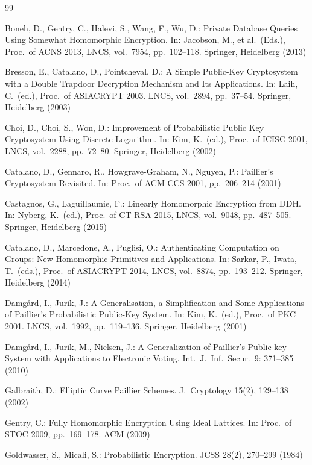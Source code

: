\documentclass[11pt,a4paper]{article}
\theoremstyle{remark}
\begin{document}
\begin{thebibliography}{99}

Boneh, D., Gentry, C., Halevi, S., Wang, F., Wu, D.: Private Database Queries Using Somewhat Homomorphic Encryption. In: Jacobson, M., et al.\ (Eds.), Proc.\ of ACNS 2013, LNCS, vol.~7954, pp.~102--118. Springer, Heidelberg (2013)

Bresson, E., Catalano, D., Pointcheval, D.: A Simple Public-Key Cryptosystem with a Double Trapdoor Decryption Mechanism and Its Applications. In: Laih, C.\ (ed.), Proc.\ of ASIACRYPT 2003. LNCS, vol.~2894, pp.~37--54. Springer, Heidelberg (2003)

Choi, D., Choi, S., Won, D.: Improvement of Probabilistic Public Key Cryptosystem Using Discrete Logarithm. In: Kim, K.\ (ed.), Proc.\ of ICISC 2001, LNCS, vol.~2288, pp.~72--80. Springer, Heidelberg (2002)

Catalano, D., Gennaro, R., Howgrave-Graham, N., Nguyen, P.: Paillier's Cryptosystem Revisited. In: Proc.\ of ACM CCS 2001, pp.~206--214 (2001)

Castagnos, G., Laguillaumie, F.: Linearly Homomorphic Encryption from DDH. In: Nyberg, K.\ (ed.), Proc.\ of CT-RSA 2015, LNCS, vol.~9048, pp.~487--505. Springer, Heidelberg (2015)

Catalano, D., Marcedone, A., Puglisi, O.: Authenticating Computation on Groups: New Homomorphic Primitives and Applications. In: Sarkar, P., Iwata, T.\ (eds.), Proc.\ of ASIACRYPT 2014, LNCS, vol.~8874, pp.~193--212. Springer, Heidelberg (2014)

Damg{\aa}rd, I., Jurik, J.: A Generalisation, a Simplification and Some Applications of Paillier's Probabilistic Public-Key System. In: Kim, K.\ (ed.), Proc.\ of PKC 2001. LNCS, vol.~1992, pp.~119--136. Springer, Heidelberg (2001)

Damg{\aa}rd, I., Jurik, M., Nielsen, J.: A Generalization of Paillier's Public-key System with Applications to Electronic Voting. Int.\ J.\ Inf.\ Secur.\ 9: 371--385 (2010)

Galbraith, D.: Elliptic Curve Paillier Schemes. J.\ Cryptology 15(2), 129--138 (2002)

Gentry, C.: Fully Homomorphic Encryption Using Ideal Lattices. In: Proc.\ of STOC 2009, pp.~169--178. ACM (2009)

Goldwasser, S., Micali, S.: Probabilistic Encryption. JCSS 28(2), 270--299 (1984)


\end{thebibliography}
\end{document}
